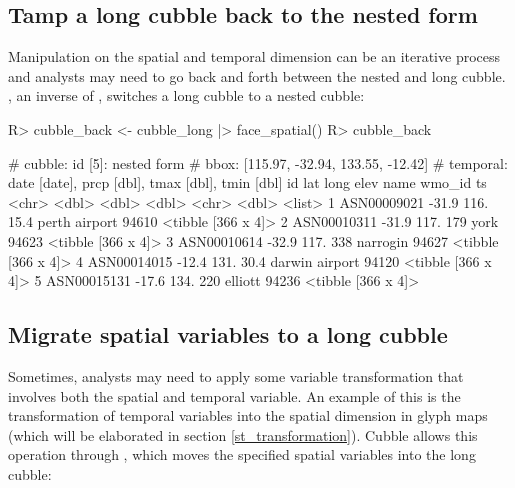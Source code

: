 \documentclass[
]{jss}
\begin{document}
\hypertarget{tamp-a-long-cubble-back-to-the-nested-form}{%
\subsection{Tamp a long cubble back to the nested
form}\label{tamp-a-long-cubble-back-to-the-nested-form}}

Manipulation on the spatial and temporal dimension can be an iterative
process and analysts may need to go back and forth between the nested
and long cubble. , an inverse of , switches
a long cubble to a nested cubble:

\begin{CodeChunk}
\begin{CodeInput}
R> cubble_back <- cubble_long |> face_spatial()
R> cubble_back
\end{CodeInput}
\begin{CodeOutput}
# cubble:   id [5]: nested form
# bbox:     [115.97, -32.94, 133.55, -12.42]
# temporal: date [date], prcp [dbl], tmax [dbl], tmin [dbl]
  id            lat  long  elev name           wmo_id ts                
  <chr>       <dbl> <dbl> <dbl> <chr>           <dbl> <list>            
1 ASN00009021 -31.9  116.  15.4 perth airport   94610 <tibble [366 x 4]>
2 ASN00010311 -31.9  117. 179   york            94623 <tibble [366 x 4]>
3 ASN00010614 -32.9  117. 338   narrogin        94627 <tibble [366 x 4]>
4 ASN00014015 -12.4  131.  30.4 darwin airport  94120 <tibble [366 x 4]>
5 ASN00015131 -17.6  134. 220   elliott         94236 <tibble [366 x 4]>
\end{CodeOutput}
\end{CodeChunk}

\hypertarget{migrate-spatial-variables-to-a-long-cubble}{%
\subsection{Migrate spatial variables to a long
cubble}\label{migrate-spatial-variables-to-a-long-cubble}}

Sometimes, analysts may need to apply some variable transformation that
involves both the spatial and temporal variable. An example of this is
the transformation of temporal variables into the spatial dimension in
glyph maps (which will be elaborated in section
\ref{st_transformation}). Cubble allows this operation through
, which moves the specified spatial variables into the
long cubble:
\end{document}
